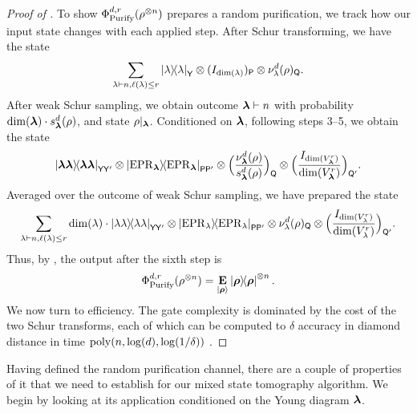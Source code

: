 \begin{proof}[Proof of ]
    To show $\Phi_{\mathrm{Purify}}^{d,r}(\rho^{\otimes n})$ prepares a random purification, we track how our input state changes with each applied step. After Schur transforming, we have the state
    \begin{equation*}
        \sum_{\lambda \vdash n, \ell(\lambda) \leq r} \ketbra{\lambda}_{\mathsf{Y}} \otimes ( I_{\dim(\lambda)} )_{\mathsf{P}} \otimes \nu^d_{\lambda}(\rho)_{\mathsf{Q}}. 
    \end{equation*}
    After weak Schur sampling, we obtain outcome $\boldsymbol{\lambda} \vdash n$ with probability $\dim(\boldsymbol{\lambda}) \cdot s^d_{\boldsymbol{\lambda}}(\rho)$, and state $\rho|_{\boldsymbol{\lambda}}$. Conditioned on $\boldsymbol{\lambda}$, following steps 3--5, we obtain the state
    \begin{equation*}
        \ketbra{\boldsymbol{\lambda}\boldsymbol{\lambda}}_{\mathsf{YY'}} \otimes \ketbra{\mathrm{EPR}_{\boldsymbol{\lambda}}}_{\mathsf{PP'}} \otimes \Big(\frac{\nu^d_{\boldsymbol{\lambda}}(\rho)}{s^d_{\boldsymbol{\lambda}}(\rho)}\Big)_{\mathsf{Q}} \otimes \Big( \frac{I_{\dim(V^r_{\boldsymbol{\lambda}})}}{\dim(V^r_{\boldsymbol{\lambda}})} \Big)_{\mathsf{Q'}}. 
    \end{equation*}
    Averaged over the outcome of weak Schur sampling, we have prepared the state
    \begin{equation*}
        \sum_{\lambda \vdash n, \ell(\lambda) \leq r}\dim(\lambda) \cdot \ketbra{\lambda\lambda}_{\mathsf{YY'}} \otimes \ketbra{\mathrm{EPR}_{\lambda}}_{\mathsf{PP'}} \otimes \nu^d_{\lambda}(\rho)_{\mathsf{Q}} \otimes \Big( \frac{I_{\dim(V^r_{\lambda})}}{\dim(V^r_{\lambda})} \Big)_{\mathsf{Q'}}.
    \end{equation*}
    Thus, by , the output after the sixth step is
    \begin{equation*}
        \Phi_{\mathrm{Purify}}^{d,r}(\rho^{\otimes n}) = \mathop{\bf E\/}_{\ket{\boldsymbol{\rho}}} \ketbra{\boldsymbol{\rho}}^{\otimes n}. 
    \end{equation*}
    We now turn to efficiency. The gate complexity is dominated by the cost of the two Schur transforms, each of which can be computed to $\delta$ accuracy in diamond distance in time $\operatorname{poly}(n, \log(d), \log(1/\delta))$ \cite{Har05}.
\end{proof}

Having defined the random purification channel, there are a couple of properties of it that we need to establish for our mixed state tomography algorithm.
We begin by looking at its application conditioned on the Young diagram $\boldsymbol{\lambda}$.


